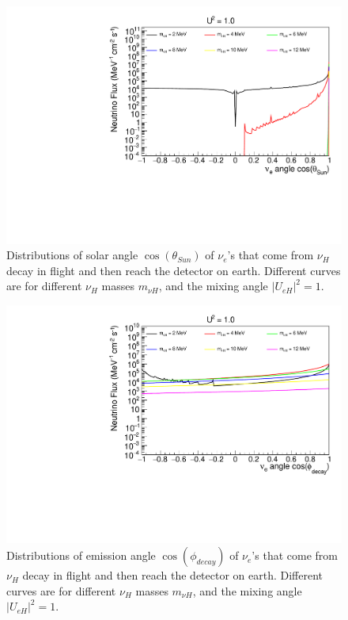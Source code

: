 \documentclass[%
 reprint,
 amsmath,amssymb,
 aps,
 prd,
floatfix,
twocolumn,
]{revtex4-1}
\begin{document}
\begin{figure}[!htbp]
\includegraphics[width=0.99\columnwidth]{../plots/DecayInFlightNuLCosthetaSun_U1.0_AllMass_linXlogY.pdf}
\caption{Distributions of solar angle $\cos(\theta_{Sun})$ of $\nu_e$'s that come from $\nu_H$ decay in flight and then reach the detector on earth. Different curves are for different $\nu_H$ masses $m_{\nu H}$, and the mixing angle $|U_{eH}|^2 = 1$.}
\label{fig:DecayInFlightTheta_U1em0_AllMass}
\end{figure}

\begin{figure}[!htbp]
\includegraphics[width=0.99\columnwidth]{../plots/DecayInFlightNuLCosphiSun_U1.0_AllMass_linXlogY.pdf}
\caption{Distributions of emission angle $\cos(\phi_{decay})$ of $\nu_e$'s that come from $\nu_H$ decay in flight and then reach the detector on earth. Different curves are for different $\nu_H$ masses $m_{\nu H}$, and the mixing angle $|U_{eH}|^2 = 1$.}
\label{fig:DecayInFlightPhi_U1em0_AllMass}
\end{figure}
\end{document}
